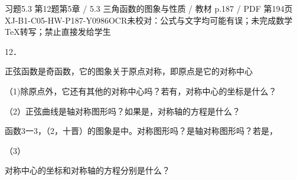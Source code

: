 \begin{bankitem}{习题5.3 第12题}{第5章 / 5.3 三角函数的图象与性质 / 教材 p.187 / PDF 第194页}{XJ-B1-C05-HW-P187-Y0986}{OCR未校对：公式与文字均可能有误；未完成数学TeX转写；禁止直接发给学生}
\begin{ocrdraft}
\par
12．
\par
正弦函数是奇函数，它的图象关于原点对称，即原点是它的对称中心
\par
（1)除原点外，它还有其他的对称中心吗？若有，对称中心的坐标是什么？
\par
（2）正弦曲线是轴对称图形吗？如果是，对称轴的方程是什么？
\par
函数3一3，（2，十晋）的图象是中。对称图形吗？是轴对称图形吗？若是，
\par
（3）
\par
对称中心的坐标和对称轴的方程分别是什么？
\end{ocrdraft}
\end{bankitem}
